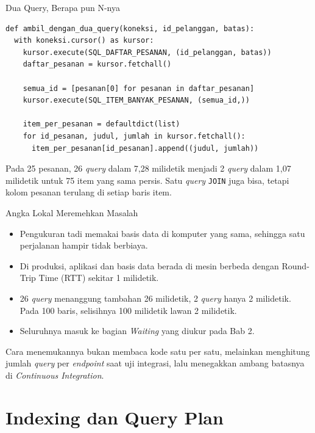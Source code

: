 \documentclass[aspectratio=169, table, 12pt]{beamer}
\begin{document}
\begin{frame}[fragile]{{\Large Dua Query, Berapa pun N-nya}}
  \vspace{2pt}
\begin{lstlisting}[style=PythonStyle]
def ambil_dengan_dua_query(koneksi, id_pelanggan, batas):
  with koneksi.cursor() as kursor:
    kursor.execute(SQL_DAFTAR_PESANAN, (id_pelanggan, batas))
    daftar_pesanan = kursor.fetchall()

    semua_id = [pesanan[0] for pesanan in daftar_pesanan]
    kursor.execute(SQL_ITEM_BANYAK_PESANAN, (semua_id,))

    item_per_pesanan = defaultdict(list)
    for id_pesanan, judul, jumlah in kursor.fetchall():
      item_per_pesanan[id_pesanan].append((judul, jumlah))
\end{lstlisting}

  \vspace{2pt}
  {\footnotesize Pada 25 pesanan, 26 \textit{query} dalam 7,28 milidetik menjadi 2
  \textit{query} dalam 1,07 milidetik untuk 75 item yang sama persis. Satu \textit{query}
  \texttt{JOIN} juga bisa, tetapi kolom pesanan terulang di setiap baris
  item.}
\end{frame}

\begin{frame}{{\Large Angka Lokal Meremehkan Masalah}}
  \vspace{8pt}
  \begin{itemize}
    \item Pengukuran tadi memakai basis data di komputer yang sama, sehingga
          satu perjalanan hampir tidak berbiaya.
    \item Di produksi, aplikasi dan basis data berada di mesin berbeda dengan
          Round-Trip Time (RTT) sekitar 1 milidetik.
    \item 26 \textit{query} menanggung tambahan 26 milidetik, 2 \textit{query} hanya 2
          milidetik. Pada 100 baris, selisihnya 100 milidetik lawan 2
          milidetik.
    \item Seluruhnya masuk ke bagian \emph{Waiting} yang diukur pada Bab 2.
  \end{itemize}
  \vspace{6pt}
  {\footnotesize Cara menemukannya bukan membaca kode satu per satu, melainkan
  menghitung jumlah \textit{query} per \textit{endpoint} saat uji integrasi, lalu
  menegakkan ambang batasnya di \textit{Continuous Integration}.}
\end{frame}

\section{Indexing dan Query Plan}
\end{document}
